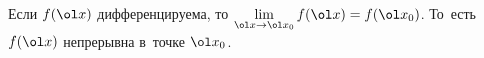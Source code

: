 
	 Если $f(\ol x) $ дифференцируема, то $\lim\limits_{\ol x\to \ol x_0}f(\ol x) = f(\ol x_0)$. То~есть $f(\ol x)$ непрерывна в~точке $\ol x_0$.
	 